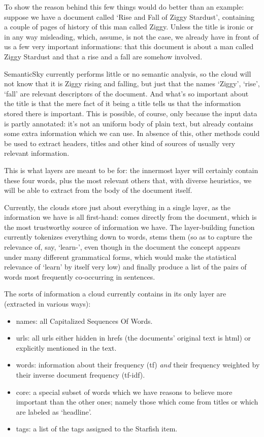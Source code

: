 \documentclass[11pt]{article}
\begin{document}
To show the reason behind this few things would do better than an example: suppose we have a document called `Rise and Fall of Ziggy Stardust', containing a couple of pages of history of this man called Ziggy. Unless the title is ironic or in any way misleading, which, assume, is not the case, we already have in front of us a few very important informations: that this document is about a man called Ziggy Stardust and that a rise and a fall are somehow involved.

SemanticSky currently performs little or no semantic analysis, so the cloud will not know that it is Ziggy rising and falling, but just that the names `Ziggy', `rise', `fall' are relevant descriptors of the document. And what's so important about the title is that the mere fact of it being a title tells us that the information stored there is important. This is possible, of course, only because the input data is partly annotated: it's not an uniform body of plain text, but already contains some extra information which we can use. In absence of this, other methods could be used to extract headers, titles and other kind of sources of usually very relevant information.

This is what layers are meant to be for: the innermost layer will certainly contain these four words, plus the most relevant others that, with diverse heuristics, we will be able to extract from the body of the document itself.

Currently, the clouds store just about everything in a single layer, as the information we have is all first-hand: comes directly from the document, which is the most trustworthy source of information we have. The layer-building function currently tokenizes everything down to words, stems them (so as to capture the relevance of, say, `learn-', even though in the document the concept appears under many different grammatical forms, which would make the statistical relevance of `learn' by itself very low) and finally produce a list of the pairs of words most frequently co-occurring in sentences.

The sorts of information a cloud currently contains in its only layer are (extracted in various ways):
\begin{itemize}
\item names: all Capitalized Sequences Of Words.
\item urls: all urls either hidden in hrefs (the documents' original text is html) or explicitly mentioned in the text.
\item words: information about their frequency (tf) \emph{and} their frequency weighted by their inverse document frequency (tf-idf).
\item core: a special subset of words which we have reasons to believe more important than the other ones; namely those which come from titles or which are labeled as `headline'.
\item tags: a list of the tags assigned to the Starfish item.
\end{itemize}
\end{document}
